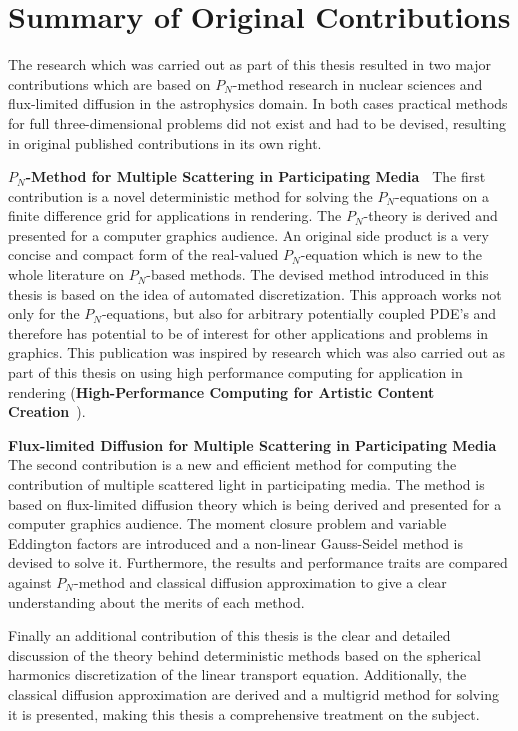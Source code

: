 \section{Summary of Original Contributions}

The research which was carried out as part of this thesis resulted in two major contributions which are based on $P_N$-method research in nuclear sciences and flux-limited diffusion in the astrophysics domain. In both cases practical methods for full three-dimensional problems did not exist and had to be devised, resulting in original published contributions in its own right.

\textbf{$P_N$-Method for Multiple Scattering in Participating Media~\cite{Koerner18}} The first contribution is a novel deterministic method for solving the $P_N$-equations on a finite difference grid for applications in rendering. The $P_N$-theory is derived and presented for a computer graphics audience. An original side product is a very concise and compact form of the real-valued $P_N$-equation which is new to the whole literature on $P_N$-based methods. The devised method introduced in this thesis is based on the idea of automated discretization. This approach works not only for the $P_N$-equations, but also for arbitrary potentially coupled PDE's and therefore has potential to be of interest for other applications and problems in graphics. This publication was inspired by research which was also carried out as part of this thesis on using high performance computing for application in rendering (\textbf{High-Performance Computing for Artistic Content Creation}~\cite{Koerner17}).

\textbf{Flux-limited Diffusion for Multiple Scattering in Participating Media~\cite{Koerner14}} The second contribution is a new and efficient method for computing the contribution of multiple scattered light in participating media. The method is based on flux-limited diffusion theory which is being derived and presented for a computer graphics audience. The moment closure problem and variable Eddington factors are introduced and a non-linear Gauss-Seidel method is devised to solve it. Furthermore, the results and performance traits are compared against $P_N$-method and classical diffusion approximation to give a clear understanding about the merits of each method.

Finally an additional contribution of this thesis is the clear and detailed discussion of the theory behind deterministic methods based on the spherical harmonics discretization of the linear transport equation. Additionally, the classical diffusion approximation are derived and a multigrid method for solving it is presented, making this thesis a comprehensive treatment on the subject.

